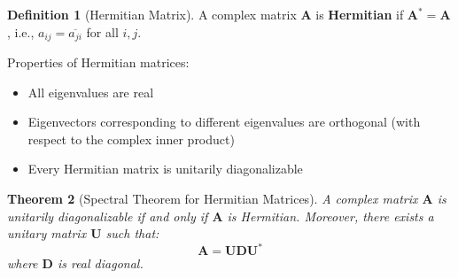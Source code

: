 \documentclass[12pt]{article}
\numberwithin{equation}{section}
\newcommand{\mat}[1]{\mathbf{#1}}        %
\theoremstyle{plain}
\newtheorem{theorem}{Theorem}[section]
\theoremstyle{definition}
\newtheorem{definition}[theorem]{Definition}
\theoremstyle{remark}
\begin{document}
\begin{definition}[Hermitian Matrix]
A complex matrix $\mat{A}$ is \textbf{Hermitian} if $\mat{A}^* = \mat{A}$, i.e., $a_{ij} = \overline{a_{ji}}$ for all $i, j$.

Properties of Hermitian matrices:
\begin{itemize}
\item All eigenvalues are real
\item Eigenvectors corresponding to different eigenvalues are orthogonal (with respect to the complex inner product)
\item Every Hermitian matrix is unitarily diagonalizable
\end{itemize}
\end{definition}

\begin{theorem}[Spectral Theorem for Hermitian Matrices]
A complex matrix $\mat{A}$ is unitarily diagonalizable if and only if $\mat{A}$ is Hermitian. Moreover, there exists a unitary matrix $\mat{U}$ such that:
$$\mat{A} = \mat{U}\mat{D}\mat{U}^*$$
where $\mat{D}$ is real diagonal.
\end{theorem}
\end{document}
